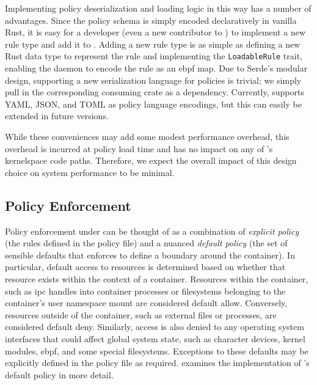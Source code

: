 Implementing policy deserialization and loading logic in this way has a number of
advantages. Since the policy schema is simply encoded declaratively in vanilla Rust, it is
easy for a developer (even a new contributor to \bpfcontain{}) to implement a new rule
type and add it to \bpfcontain{}. Adding a new rule type is as simple as defining a new
Rust data type to represent the rule and implementing the \texttt{LoadableRule} trait,
enabling the daemon to encode the rule as an \gls{ebpf} map. Due to Serde's modular
design, supporting a new serialization language for \bpfcontain{} policies is trivial; we
simply pull in the corresponding consuming crate as a dependency. Currently, \bpfcontain{}
supports YAML, JSON, and TOML as policy language encodings, but this can easily be
extended in future versions.

While these conveniences may add some modest performance overhead, this overhead is
incurred at policy load time and has no impact on any of \bpfcontain{}'s kernelspace code
paths. Therefore, we expect the overall impact of this design choice on system
performance to be minimal.

\subsection{Policy Enforcement}%
\label{ss:bpfcontain-enforcement}

Policy enforcement under \bpfcontain{} can be thought of as a combination of
\textit{explicit policy} (the rules defined in the policy file) and a nuanced
\textit{default policy} (the set of sensible defaults that \bpfcontain{} enforces to
define a boundary around the container). In particular, default access to resources is
determined based on whether that resource exists within the context of a container.
Resources within the container, such as \gls{ipc} handles into container processes or
filesystems belonging to the container's user namespace mount are considered
default allow. Conversely, resources outside of the container, such as external files or
processes, are considered default deny. Similarly, access is also denied to any operating
system interfaces that could affect global system state, such as character devices, kernel
modules, \gls{ebpf}, and some special filesystems. Exceptions to these defaults may
be explicitly defined in the policy file as required. 
examines the implementation of \bpfcontain{}'s default policy in more detail.

